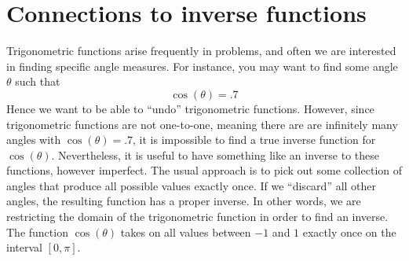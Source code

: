 \documentclass{ximera}
\begin{document}
\section{Connections to inverse functions}




Trigonometric functions arise frequently in problems, and often we are
interested in finding specific angle measures.  For instance, you may
want to find some angle $\theta$ such that
\[
\cos(\theta) = .7
\]
Hence we want to be able to ``undo'' trigonometric functions. However, since
trigonometric functions are not one-to-one, meaning there are are
infinitely many angles with $\cos(\theta) = .7$, it is impossible to
find a true inverse function for $\cos(\theta)$. Nevertheless, it is
useful to have something like an inverse to these functions, however
imperfect. The usual approach is to pick out some collection of angles
that produce all possible values exactly once. If we ``discard'' all
other angles, the resulting function has a proper inverse.  In other
words, we are restricting the domain of the trigonometric function in
order to find an inverse.  The function $\cos(\theta)$ takes on all
values between $-1$ and $1$ exactly once on the interval $[0,\pi]$.
\end{document}
